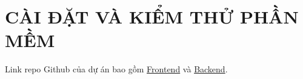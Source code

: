 \chapter{CÀI ĐẶT VÀ KIỂM THỬ PHẦN MỀM}
Link repo Github của dự án bao gồm \textcolor{cyan}{\href{https://github.com/MeReMa-UIT/merema}{Frontend}} và \textcolor{cyan}{\href{https://github.com/MeReMa-UIT/server}{Backend}}.
